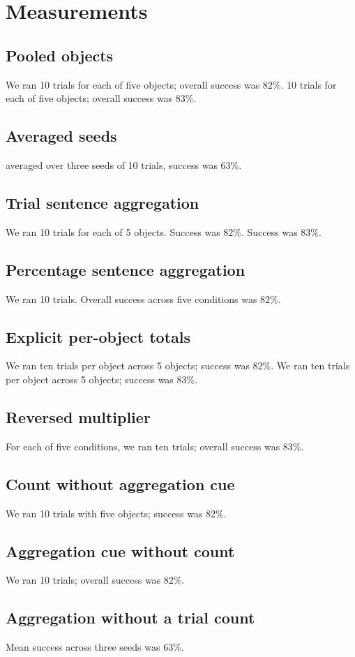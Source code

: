 \section{Measurements}
\subsection{Pooled objects}
We ran 10 trials for each of five objects; overall success was 82\%.
10 trials for each of five objects; overall success was 83\%.
\subsection{Averaged seeds}
averaged over three seeds of 10 trials, success was 63\%.
\subsection{Trial sentence aggregation}
We ran 10 trials for each of 5 objects.
Success was 82\%.
Success was 83\%.
\subsection{Percentage sentence aggregation}
We ran 10 trials.
Overall success across five conditions was 82\%.
\subsection{Explicit per-object totals}
We ran ten trials per object across 5 objects; success was 82\%.
We ran ten trials per object across 5 objects; success was 83\%.
\subsection{Reversed multiplier}
For each of five conditions, we ran ten trials; overall success was 83\%.
\subsection{Count without aggregation cue}
We ran 10 trials with five objects; success was 82\%.
\subsection{Aggregation cue without count}
We ran 10 trials; overall success was 82\%.
\subsection{Aggregation without a trial count}
Mean success across three seeds was 63\%.
\nocite{*}
